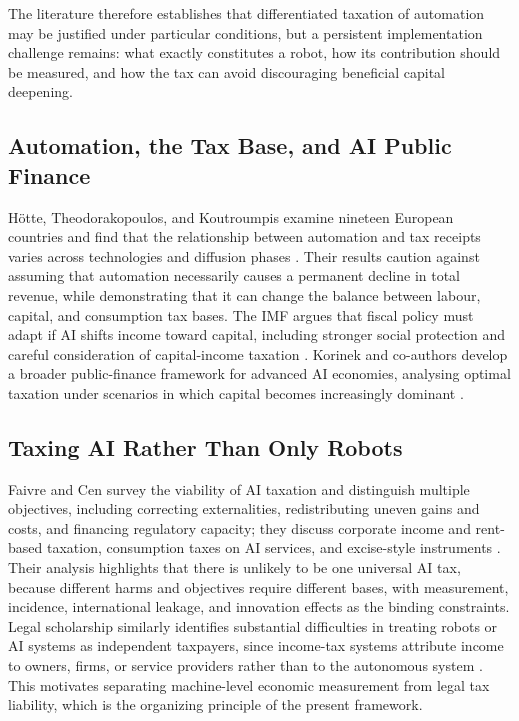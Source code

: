 \documentclass[journal]{IEEEtran}
\theoremstyle{plain}
\theoremstyle{definition}
\begin{document}
The literature therefore establishes that differentiated taxation of automation may be justified under particular conditions, but a persistent implementation challenge remains: what exactly constitutes a robot, how its contribution should be measured, and how the tax can avoid discouraging beneficial capital deepening.

\subsection{Automation, the Tax Base, and AI Public Finance}

H\"{o}tte, Theodorakopoulos, and Koutroumpis examine nineteen European countries and find that the relationship between automation and tax receipts varies across technologies and diffusion phases \cite{Hotte2024}. Their results caution against assuming that automation necessarily causes a permanent decline in total revenue, while demonstrating that it can change the balance between labour, capital, and consumption tax bases. The IMF argues that fiscal policy must adapt if AI shifts income toward capital, including stronger social protection and careful consideration of capital-income taxation \cite{IMF2024Fiscal,IMF2026GlobalAI}. Korinek and co-authors develop a broader public-finance framework for advanced AI economies, analysing optimal taxation under scenarios in which capital becomes increasingly dominant \cite{Korinek2026}.

\subsection{Taxing AI Rather Than Only Robots}

Faivre and Cen survey the viability of AI taxation and distinguish multiple objectives, including correcting externalities, redistributing uneven gains and costs, and financing regulatory capacity; they discuss corporate income and rent-based taxation, consumption taxes on AI services, and excise-style instruments \cite{FaivreCen2026}. Their analysis highlights that there is unlikely to be one universal AI tax, because different harms and objectives require different bases, with measurement, incidence, international leakage, and innovation effects as the binding constraints. Legal scholarship similarly identifies substantial difficulties in treating robots or AI systems as independent taxpayers, since income-tax systems attribute income to owners, firms, or service providers rather than to the autonomous system \cite{DimitropoulouAIIncome}. This motivates separating machine-level economic measurement from legal tax liability, which is the organizing principle of the present framework.
\end{document}
